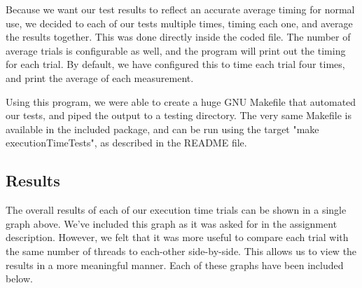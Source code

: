 \documentclass[journal]{IEEEtran}
\begin{document}
Because we want our test results to reflect an accurate average timing for normal use, we decided to each of our tests multiple times, timing each one, and average the results together. This was done directly inside the coded file. The number of average trials is configurable as well, and the program will print out the timing for each trial. By default, we have configured this to time each trial four times, and print the average of each measurement.

Using this program, we were able to create a huge GNU Makefile that automated our tests, and piped the output to a testing directory. The very same Makefile is available in the included package, and can be run using the target "make executionTimeTests", as described in the README file.

\subsection{Results}

The overall results of each of our execution time trials can be shown in a single graph above. We've included this graph as it was asked for in the assignment description. However, we felt that it was more useful to compare each trial with the same number of threads to each-other side-by-side. This allows us to view the results in a more meaningful manner. Each of these graphs have been included below.
\end{document}
